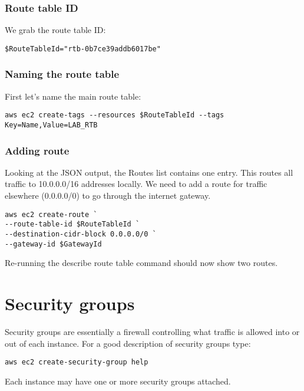 \documentclass{pgnotes}
\begin{document}
\subsubsection{Route table ID}

We grab the route table ID:
\begin{verbatim}
$RouteTableId="rtb-0b7ce39addb6017be"
\end{verbatim}

\subsubsection{Naming the route table}

First let's name the main route table:

\begin{verbatim}
aws ec2 create-tags --resources $RouteTableId --tags Key=Name,Value=LAB_RTB
\end{verbatim}

\subsubsection{Adding route}

Looking at the JSON output, the Routes list contains one entry. This
routes all traffic to 10.0.0.0/16 addresses locally. We need to add a
route for traffic elsewhere (0.0.0.0/0) to go through the internet
gateway.

\begin{verbatim}
aws ec2 create-route `
--route-table-id $RouteTableId `
--destination-cidr-block 0.0.0.0/0 `
--gateway-id $GatewayId
\end{verbatim}

Re-running the describe route table command should now show two routes.

\section{Security groups}
\label{security-groups}

Security groups are essentially a firewall controlling what traffic is
allowed into or out of each instance. For a good description of security
groups type:

\begin{verbatim}
aws ec2 create-security-group help
\end{verbatim}

Each instance may have one or more security groups attached.
\end{document}

